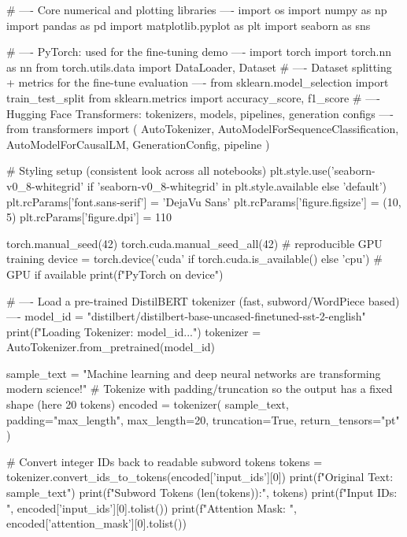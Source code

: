 
\begin{codebox}[title={Core numerical and plotting libraries}]
# ---- Core numerical and plotting libraries ----
import os
import numpy as np
import pandas as pd
import matplotlib.pyplot as plt
import seaborn as sns

# ---- PyTorch: used for the fine-tuning demo ----
import torch
import torch.nn as nn
from torch.utils.data import DataLoader, Dataset
# ---- Dataset splitting + metrics for the fine-tune evaluation ----
from sklearn.model_selection import train_test_split
from sklearn.metrics import accuracy_score, f1_score
# ---- Hugging Face Transformers: tokenizers, models, pipelines, generation configs ----
from transformers import (
    AutoTokenizer,
    AutoModelForSequenceClassification,
    AutoModelForCausalLM,
    GenerationConfig,
    pipeline
)

# Styling setup (consistent look across all notebooks)
plt.style.use('seaborn-v0_8-whitegrid' if 'seaborn-v0_8-whitegrid' in plt.style.available else 'default')
plt.rcParams['font.sans-serif'] = 'DejaVu Sans'
plt.rcParams['figure.figsize'] = (10, 5)
plt.rcParams['figure.dpi'] = 110

torch.manual_seed(42)
torch.cuda.manual_seed_all(42)  # reproducible GPU training
device = torch.device('cuda' if torch.cuda.is_available() else 'cpu')  # GPU if available
print(f"PyTorch on {device}")
\end{codebox}

\begin{codebox}[title={Load a pre-trained DistilBERT tokenizer (fast, subword/WordPiece based)}]
# ---- Load a pre-trained DistilBERT tokenizer (fast, subword/WordPiece based) ----
model_id = "distilbert/distilbert-base-uncased-finetuned-sst-2-english"
print(f"Loading Tokenizer: {model_id}...")
tokenizer = AutoTokenizer.from_pretrained(model_id)

sample_text = "Machine learning and deep neural networks are transforming modern science!"
# Tokenize with padding/truncation so the output has a fixed shape (here 20 tokens)
encoded = tokenizer(
    sample_text,
    padding="max_length",
    max_length=20,
    truncation=True,
    return_tensors="pt"
)

# Convert integer IDs back to readable subword tokens
tokens = tokenizer.convert_ids_to_tokens(encoded['input_ids'][0])
print(f"Original Text: {sample_text}\n")
print(f"Subword Tokens ({len(tokens)}):\n", tokens)
print(f"Input IDs:      \n", encoded['input_ids'][0].tolist())
print(f"Attention Mask: \n", encoded['attention_mask'][0].tolist())
\end{codebox}

